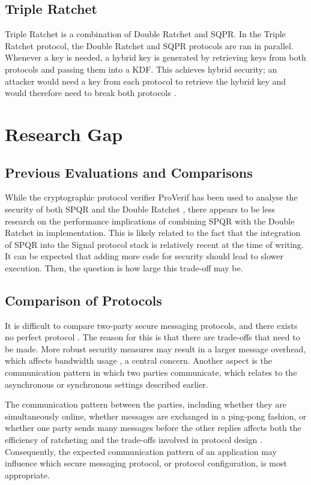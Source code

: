 \subsection{Triple Ratchet}

Triple Ratchet is a combination of Double Ratchet and SQPR. In the Triple Ratchet protocol, the Double Ratchet and SQPR protocols are ran in parallel. Whenever a key is needed, a hybrid key is generated by retrieving keys from both protocols and passing them into a KDF. This achieves hybrid security; an attacker would need a key from each protocol to retrieve the hybrid key and would therefore need to break both protocols \cite{ref20}.  

\section{Research Gap}

\subsection{Previous Evaluations and Comparisons}

While the cryptographic protocol verifier ProVerif has been used to analyse the security of both SPQR \cite{ref19} and the Double Ratchet \cite{ref26}, there appears to be less research on the performance implications of combining SPQR with the Double Ratchet in implementation. This is likely related to the fact that the integration of SPQR into the Signal protocol stack is relatively recent at the time of writing. It can be expected that adding more code for security should lead to slower execution. Then, the question is how large this trade-off may be. 

\subsection{Comparison of Protocols}

It is difficult to compare two-party secure messaging protocols, and there exists no perfect protocol \cite{ref09}. The reason for this is that there are trade-offs that need to be made. More robust security measures may result in a larger message overhead, which affects bandwidth usage \cite{ref09}, a central concern. Another aspect is the communication pattern \cite{ref09} in which two parties communicate, which relates to the asynchronous or synchronous settings described earlier. 

The communication pattern between the parties, including whether they are simultaneously online, whether messages are exchanged in a ping-pong fashion, or whether one party sends many messages before the other replies affects both the efficiency of ratcheting and the trade-offs involved in protocol design \cite{ref20}. Consequently, the expected communication pattern of an application may influence which secure messaging protocol, or protocol configuration, is most appropriate. 

